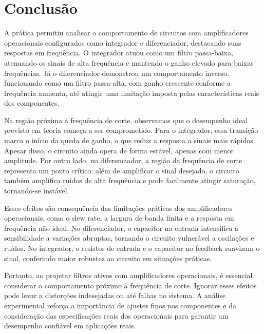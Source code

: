 \section{Conclusão}

A prática permitiu analisar o comportamento de circuitos com amplificadores operacionais configurados como integrador e diferenciador, destacando suas respostas em frequência. O integrador atuou como um filtro passa-baixa, atenuando os sinais de alta frequência e mantendo o ganho elevado para baixas frequências. Já o diferenciador demonstrou um comportamento inverso, funcionando como um filtro passa-alta, com ganho crescente conforme a frequência aumenta, até atingir uma limitação imposta pelas características reais dos componentes.

Na região próxima à frequência de corte, observamos que o desempenho ideal previsto em teoria começa a ser comprometido. Para o integrador, essa transição marca o início da queda de ganho, o que reduz a resposta a sinais mais rápidos. Apesar disso, o circuito ainda opera de forma estável, apenas com menor amplitude. Por outro lado, no diferenciador, a região da frequência de corte representa um ponto crítico: além de amplificar o sinal desejado, o circuito também amplifica ruídos de alta frequência e pode facilmente atingir saturação, tornando-se instável.

Esses efeitos são consequência das limitações práticas dos amplificadores operacionais, como o slew rate, a largura de banda finita e a resposta em frequência não ideal. No diferenciador, o capacitor na entrada intensifica a sensibilidade a variações abruptas, tornando o circuito vulnerável a oscilações e ruídos. No integrador, o resistor de entrada e o capacitor no feedback suavizam o sinal, conferindo maior robustez ao circuito em situações práticas.

Portanto, ao projetar filtros ativos com amplificadores operacionais, é essencial considerar o comportamento próximo à frequência de corte. Ignorar esses efeitos pode levar a distorções indesejadas ou até falhas no sistema. A análise experimental reforça a importância de ajustes finos nos componentes e da consideração das especificações reais dos operacionais para garantir um desempenho confiável em aplicações reais.
\nocite{boylestad, malvino}
